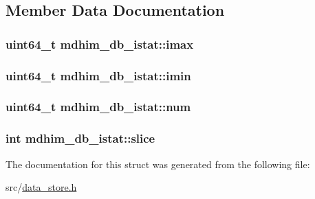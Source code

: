 \subsection{Member Data Documentation}
\hypertarget{structmdhim__db__istat_a9e6b79101a083afc00c3ccc47cfc96d6}{
\subsubsection[{imax}]{\setlength{\rightskip}{0pt plus 5cm}uint64\-\_\-t mdhim\-\_\-db\-\_\-istat\-::imax}}\label{d9/d79/structmdhim__db__istat_a9e6b79101a083afc00c3ccc47cfc96d6}
\hypertarget{structmdhim__db__istat_a6b2cfaa0eab14f94924d79c8b722aad8}{
\subsubsection[{imin}]{\setlength{\rightskip}{0pt plus 5cm}uint64\-\_\-t mdhim\-\_\-db\-\_\-istat\-::imin}}\label{d9/d79/structmdhim__db__istat_a6b2cfaa0eab14f94924d79c8b722aad8}
\hypertarget{structmdhim__db__istat_a18e1713a8ca30875d6cd914b11e8a70e}{
\subsubsection[{num}]{\setlength{\rightskip}{0pt plus 5cm}uint64\-\_\-t mdhim\-\_\-db\-\_\-istat\-::num}}\label{d9/d79/structmdhim__db__istat_a18e1713a8ca30875d6cd914b11e8a70e}
\hypertarget{structmdhim__db__istat_aa478e3ac191e0899e25f312d8aa33b41}{
\subsubsection[{slice}]{\setlength{\rightskip}{0pt plus 5cm}int mdhim\-\_\-db\-\_\-istat\-::slice}}\label{d9/d79/structmdhim__db__istat_aa478e3ac191e0899e25f312d8aa33b41}


The documentation for this struct was generated from the following file\-:\begin{DoxyCompactItemize}
\item 
src/\hyperlink{data__store_8h}{data\-\_\-store.\-h}\end{DoxyCompactItemize}

